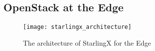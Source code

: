 \subsection{OpenStack at the Edge}

\begin{figure}[h!]
    \centering
    \texttt{[image: starlingx\_architecture]}
    \label{fig:figure13}
    \caption{The architecture of StarlingX for the Edge}
\end{figure}

